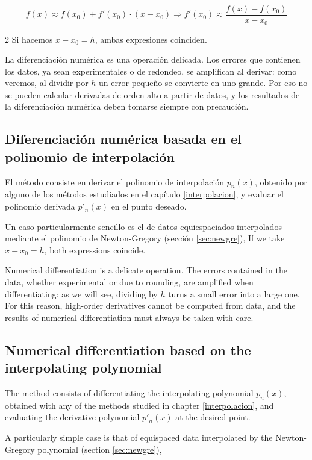 \begin{equation*}
f(x)\approx f(x_0)+f'(x_0)\cdot(x-x_0) \Rightarrow f'(x_0)\approx \frac{f(x)-f(x_0)}{x-x_0}
\end{equation*}
\begin{paracol}{2}
Si hacemos $x-x_0=h$, ambas expresiones coinciden.

La diferenciación numérica es una operación delicada. Los errores que contienen los datos, ya sean experimentales o de redondeo, se amplifican al derivar: como veremos, al dividir por $h$ un error pequeño se convierte en uno grande. Por eso no se pueden calcular derivadas de orden alto a partir de datos, y los resultados de la diferenciación numérica deben tomarse siempre con precaución.

\subsection{Diferenciación numérica basada en el polinomio de interpolación}

El método consiste en derivar el polinomio de interpolación $p_n(x)$, obtenido por alguno de los métodos estudiados en el capítulo \ref{interpolacion}, y evaluar el polinomio derivada $p'_n(x)$ en el punto deseado.

Un caso particularmente sencillo es el de datos equiespaciados interpolados mediante el polinomio de Newton-Gregory (sección \ref{sec:newgre}),
\switchcolumn
If we take $x-x_0=h$, both expressions coincide.

Numerical differentiation is a delicate operation. The errors contained in the data, whether experimental or due to rounding, are amplified when differentiating: as we will see, dividing by $h$ turns a small error into a large one. For this reason, high-order derivatives cannot be computed from data, and the results of numerical differentiation must always be taken with care.

\subsection{Numerical differentiation based on the interpolating polynomial}

The method consists of differentiating the interpolating polynomial $p_n(x)$, obtained with any of the methods studied in chapter \ref{interpolacion}, and evaluating the derivative polynomial $p'_n(x)$ at the desired point.

A particularly simple case is that of equispaced data interpolated by the Newton-Gregory polynomial (section \ref{sec:newgre}),
\end{paracol}
